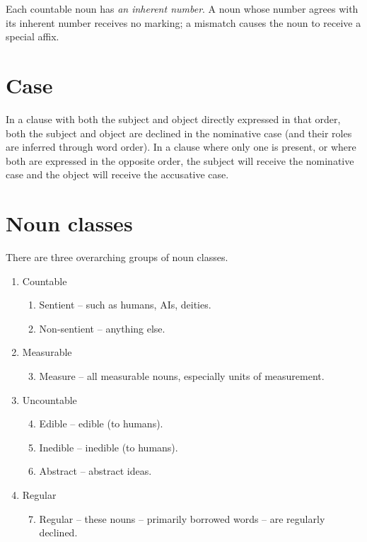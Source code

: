 \documentclass{book}
\begin{document}
Each countable noun has \emph{an inherent number}. A noun whose number agrees with its inherent number receives no marking; a mismatch causes the noun to receive a special affix.

\section{Case}

In a clause with both the subject and object directly expressed in that order, both the subject and object are declined in the nominative case (and their roles are inferred through word order). In a clause where only one is present, or where both are expressed in the opposite order, the subject will receive the nominative case and the object will receive the accusative case.

\section{Noun classes}

There are three overarching groups of noun classes.

\begin{enumerate}
  \item Countable
  \begin{enumerate}
    \item Sentient -- such as humans, AIs, deities.
    \item Non-sentient -- anything else.
  \end{enumerate}
  \item Measurable
  \begin{enumerate}
    \setcounter{enumi}{2}
    \item Measure -- all measurable nouns, especially units of measurement.
  \end{enumerate}
  \item Uncountable
  \begin{enumerate}
    \setcounter{enumi}{3}
    \item Edible -- edible (to humans).
    \item Inedible -- inedible (to humans).
    \item Abstract -- abstract ideas.
  \end{enumerate}
  \item Regular
  \begin{enumerate}
    \setcounter{enumi}{6}
    \item Regular -- these nouns -- primarily borrowed words -- are regularly declined.
  \end{enumerate}
\end{enumerate}
\end{document}
